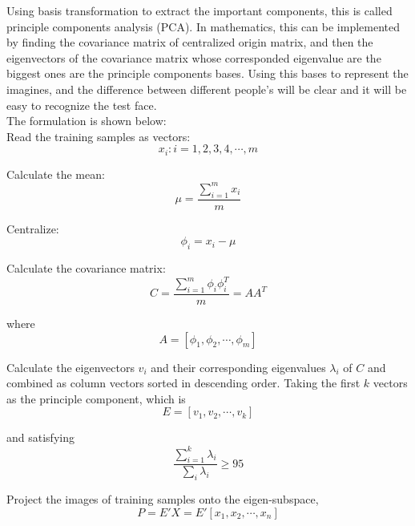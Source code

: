 \documentclass[sigconf]{acmart}
\begin{document}
Using basis transformation to extract the important components, this is called principle components analysis (PCA). In mathematics, this can be implemented by finding the covariance matrix of centralized origin matrix, and then the eigenvectors of the covariance matrix whose corresponded eigenvalue are the biggest ones are the principle components bases. Using this bases to represent the imagines, and the difference between different people's will be clear and it will be easy to recognize the test face.\\

The formulation is shown below:\\

Read the training samples as vectors:
\begin{displaymath}
	x_i: i = 1, 2, 3, 4,\cdots, m
\end{displaymath}

Calculate the mean:
\begin{displaymath}
	\mu = \frac{\sum_{i=1}^{m}x_i}{m}
\end{displaymath}

Centralize:
\begin{displaymath}
	\phi_i = x_i - \mu
\end{displaymath}

Calculate the covariance matrix:
\begin{displaymath}
	C = \frac{\sum_{i=1}^m\phi_i\phi_i^{T}}{m} = AA^{T}
\end{displaymath}

where
\begin{displaymath}
	A = [\phi_1, \phi_2, \cdots, \phi_{m}]
\end{displaymath}

Calculate the eigenvectors $v_i$ and their corresponding eigenvalues $\lambda_i$ of $C$ and combined as column vectors sorted in descending order. Taking the first $k$ vectors as the principle component, which is
\begin{displaymath}
	E = [v_1, v_2,\cdots,v_k]
\end{displaymath}

and satisfying
\begin{displaymath}
	\frac{\sum_{i=1}^k\lambda_i}{\sum_{i}\lambda_i} \ge 95%
\end{displaymath}

Project the images of training samples onto the eigen-subspace, 
\begin{displaymath}
	P = E'X = E'[x_1, x_2,\cdots, x_n]
\end{displaymath}
\end{document}
